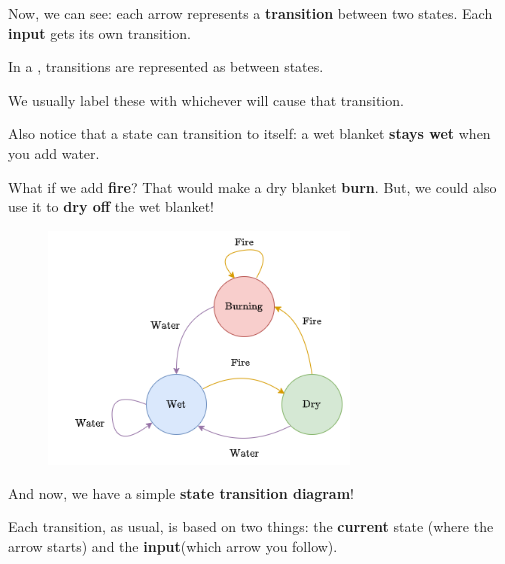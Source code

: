         Now, we can see: each arrow represents a \textbf{transition} between two states. Each \textbf{input} gets its own transition.\\
        
        \begin{concept}
            In a , transitions are represented as  between states.
            
            We usually label these with whichever  will cause that transition.
        \end{concept}
        
        Also notice that a state can transition to itself: a wet blanket \textbf{stays wet} when you add water.
        
        What if we add \textbf{fire}? That would make a dry blanket \textbf{burn}. But, we could also use it to \textbf{dry off} the wet blanket!
        
        \begin{figure}[H]
            \centering
            \includegraphics[width=80mm,scale=0.4]{images/rnn_images/std_fire_and_water.png}
        \end{figure}
        
        And now, we have a simple \textbf{state transition diagram}!
        
        Each transition, as usual, is based on two things: the \textbf{current} state (where the arrow starts) and the \textbf{input}(which arrow you follow).\\
        
